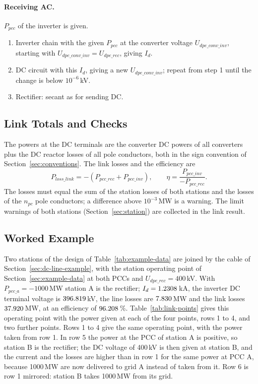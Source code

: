 \paragraph{Receiving AC.} $P_{pcc}$ of the inverter is given.
\begin{enumerate}
  \item Inverter chain with the given $P_{pcc}$ at the converter voltage $U_{dpe\_conv\_inv}$, starting with
        $U_{dpe\_conv\_inv} = U_{dpe\_rec}$, giving $I_d$.
  \item DC circuit with this $I_d$, giving a new $U_{dpe\_conv\_inv}$; repeat from step 1 until the change is below
        $10^{-6}$\,kV.
  \item Rectifier: secant as for sending DC.
\end{enumerate}

\subsection{Link Totals and Checks}
\label{sec:link-totals}

The powers at the DC terminals are the converter DC powers of all converters plus the DC reactor losses of all pole
conductors, both in the sign convention of Section~\ref{sec:conventions}. The link losses and the efficiency are
\begin{equation}
  P_{loss\_link} = -\left( P_{pcc\_rec} + P_{pcc\_inv} \right) , \qquad
  \eta = \frac{P_{pcc\_inv}}{-P_{pcc\_rec}} .
\end{equation}
The losses must equal the sum of the station losses of both stations and the losses of the $n_{pc}$ pole conductors;
a difference above $10^{-3}$\,MW is a warning. The limit warnings of both stations (Section~\ref{sec:station}) are
collected in the link result.

\subsection{Worked Example}
\label{sec:link-example}

Two stations of the design of Table~\ref{tab:example-data} are joined by the cable of
Section~\ref{sec:dc-line-example}, with the station operating point of Section~\ref{sec:example-data} at both PCCs and
$U_{dpe\_rec} = 400$\,kV. With $P_{pcc\_a} = -1000$\,MW station A is the rectifier; $I_d = 1.2308$\,kA, the inverter DC
terminal voltage is $396.819$\,kV, the line losses are $7.830$\,MW and the link losses $37.920$\,MW, at an
efficiency of $96.208$\,\%. Table~\ref{tab:link-points} gives this operating point with the power given at each of
the four points, rows 1 to 4, and two further points. Rows 1 to 4 give the same operating point, with the power taken
from row 1. In row 5 the power at the PCC of station A is positive, so station B is the rectifier; the DC voltage of
400\,kV is then given at station B, and the current and the losses are higher than in row 1 for the same power at
PCC A, because 1000\,MW are now delivered to grid A instead of taken from it. Row 6 is row 1 mirrored: station B takes
1000\,MW from its grid.

